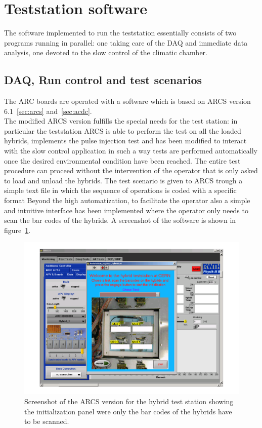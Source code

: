 \section{Teststation software}
\label{sec:sw}

The software implemented to run the teststation essentially consists of two programs running in parallel: one taking care of the DAQ and immediate data analysis, one devoted to the slow control of the climatic chamber. 

\subsection{DAQ, Run control and test scenarios}

The ARC boards are operated with a software which is based on ARCS version 6.1~\ref{sec:arcs} and~\ref{sec:acdc}.\\
The modified ARCS version fulfills the special needs for the test station: in particular the teststation ARCS is able to perform the test on all the loaded hybrids, implements the pulse injection test and 
has been modified to interact with the slow control application in such a way tests are performed automatically once the desired environmental condition have been reached. The entire test procedure can proceed without the intervention of the operator that is only asked to load and unload the hybrids. The test scenario is given to ARCS trough a simple text file in which the sequence of operations is coded with a specific format
Beyond the high automatization, to facilitate the operator also a simple and intuitive interface has been implemented where the operator only needs to scan the bar codes of the hybrids. A screenshot of the software is shown in figure~\ref{fig:ss_arcs_teststation}.
\begin{figure}[h]
  \begin{center}
    \includegraphics[width=\textwidth]{fig/ss_arcs_hybrid_test_station_mod.pdf}
    \caption{Screenshot of the ARCS version for the hybrid test station showing the initialization panel were only the bar codes of the hybrids have to be scanned.}
    \label{fig:ss_arcs_teststation}
  \end{center}
\end{figure}

